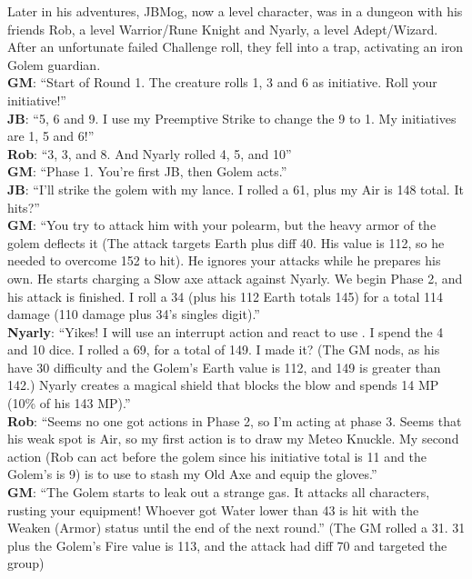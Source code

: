 \begin{multimog}
Later in his adventures, JBMog, now a  level character, was in a dungeon with his friends Rob, a  level Warrior/Rune Knight and Nyarly, a  level Adept/Wizard. After an unfortunate failed Challenge roll, they fell into a trap, activating an iron Golem guardian. \\
\textbf{GM}: \enquote{Start of Round 1. The creature rolls 1, 3 and 6 as initiative. Roll your initiative!} \\
\textbf{JB}: \enquote{5, 6 and 9. I use my Preemptive Strike to change the 9 to 1. My initiatives are 1, 5 and 6!} \\
\textbf{Rob}: \enquote{3, 3, and 8. And Nyarly rolled 4, 5, and 10} \\
\textbf{GM}: \enquote{Phase 1. You're first JB, then Golem acts.} \\
\textbf{JB}: \enquote{I'll strike the golem with my lance. I rolled a 61, plus my Air is 148 total. It hits?} \\
\textbf{GM}: \enquote{You try to attack him with your polearm, but the heavy armor of the golem deflects it (The attack targets Earth plus diff 40. His value is 112, so he needed to overcome 152 to hit). He ignores your attacks while he prepares his own. He starts charging a Slow axe attack against Nyarly. We begin Phase 2, and his attack is finished. I roll a 34 (plus his 112 Earth totals 145) for a total 114 damage (110 damage plus 34's singles digit).} \\
\textbf{Nyarly}: \enquote{Yikes! I will use an interrupt action and react to use . I spend the 4 and 10 dice. I rolled a 69, for a total of 149. I made it? (The GM nods, as his  have 30 difficulty and the Golem's Earth value is 112, and 149 is greater than 142.) Nyarly creates a magical shield that blocks the blow and spends 14 MP (10\% of his 143 MP).} \\
\textbf{Rob}: \enquote{Seems no one got actions in Phase 2, so I'm acting at phase 3. Seems that his weak spot is Air, so my first action is to draw my Meteo Knuckle. My second action (Rob can act before the golem since his initiative total is 11 and the Golem's is 9) is to use  to stash my Old Axe and equip the gloves.} \\
\textbf{GM}: \enquote{The Golem starts to leak out a strange gas. It attacks all characters, rusting your equipment! Whoever got Water lower than 43 is hit with the Weaken (Armor) status until the end of the next round.} (The GM rolled a 31. 31 plus the Golem's Fire value is 113, and the attack had diff 70 and targeted the group) \\

\end{multimog}
